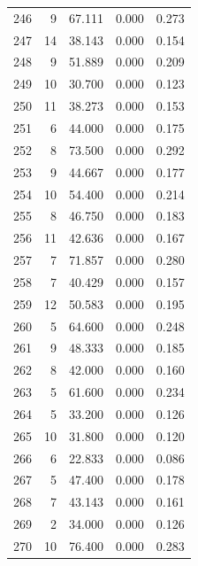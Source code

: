 \begin{table}
\begin{tabular}{rrrrr}
 246 &      9 &         67.111 &        0.000 &           0.273 \\
 247 &     14 &         38.143 &        0.000 &           0.154 \\
 248 &      9 &         51.889 &        0.000 &           0.209 \\
 249 &     10 &         30.700 &        0.000 &           0.123 \\
 250 &     11 &         38.273 &        0.000 &           0.153 \\
 251 &      6 &         44.000 &        0.000 &           0.175 \\
 252 &      8 &         73.500 &        0.000 &           0.292 \\
 253 &      9 &         44.667 &        0.000 &           0.177 \\
 254 &     10 &         54.400 &        0.000 &           0.214 \\
 255 &      8 &         46.750 &        0.000 &           0.183 \\
 256 &     11 &         42.636 &        0.000 &           0.167 \\
 257 &      7 &         71.857 &        0.000 &           0.280 \\
 258 &      7 &         40.429 &        0.000 &           0.157 \\
 259 &     12 &         50.583 &        0.000 &           0.195 \\
 260 &      5 &         64.600 &        0.000 &           0.248 \\
 261 &      9 &         48.333 &        0.000 &           0.185 \\
 262 &      8 &         42.000 &        0.000 &           0.160 \\
 263 &      5 &         61.600 &        0.000 &           0.234 \\
 264 &      5 &         33.200 &        0.000 &           0.126 \\
 265 &     10 &         31.800 &        0.000 &           0.120 \\
 266 &      6 &         22.833 &        0.000 &           0.086 \\
 267 &      5 &         47.400 &        0.000 &           0.178 \\
 268 &      7 &         43.143 &        0.000 &           0.161 \\
 269 &      2 &         34.000 &        0.000 &           0.126 \\
 270 &     10 &         76.400 &        0.000 &           0.283 \\

\end{tabular}
\end{table}

